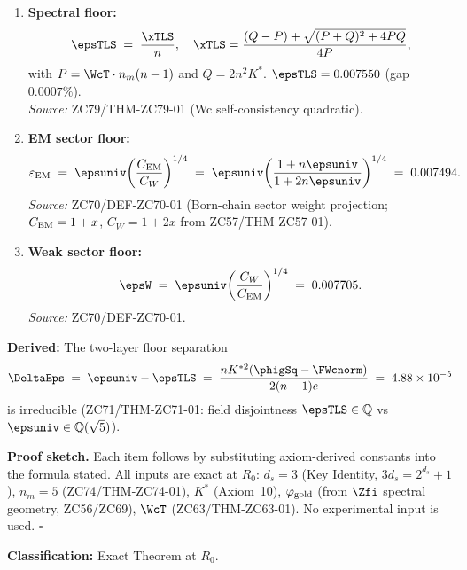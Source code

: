 \documentclass[12pt, a4paper]{article}
\renewcommand{\epsEM}{\varepsilon_{\rm EM}}
\begin{document}
\begin{formalbox}[title={THM-ZC80-01: Electroweak Completeness
  ($R_0$, Exact)}]
\begin{enumerate}[leftmargin=2em, label=\textbf{(\arabic*)}]
\item \textbf{Spectral floor:}
\begin{equation}
  \epsTLS
  \;=\; \frac{\xTLS}{n},
  \quad
  \xTLS = \frac{(Q-P)+\sqrt{(P+Q)^2+4PQ}}{4P},
  \label{eq:epsTLS}
\end{equation}
with $P = \WcT\cdot n_m(n-1)$ and $Q = 2n^2K^*$. \quad
$\epsTLS = 0.007550$ (gap $0.0007\%$).\\
\textit{Source:} ZC79/THM-ZC79-01 (Wc self-consistency
quadratic).

\item \textbf{EM sector floor:}
\begin{equation}
  \epsEM
  \;=\; \epsuniv\!\left(\frac{C_{\rm EM}}{C_W}\right)^{1/4}
  \;=\; \epsuniv\!\left(\frac{1+n\epsuniv}{1+2n\epsuniv}\right)^{1/4}
  \;=\; 0.007494.
  \label{eq:epsEM}
\end{equation}
\textit{Source:} ZC70/DEF-ZC70-01 (Born-chain sector weight
projection; $C_{\rm EM} = 1+x$, $C_W = 1+2x$ from
ZC57/THM-ZC57-01).

\item \textbf{Weak sector floor:}
\begin{equation}
  \epsW
  \;=\; \epsuniv\!\left(\frac{C_W}{C_{\rm EM}}\right)^{1/4}
  \;=\; 0.007705.
  \label{eq:epsW}
\end{equation}
\textit{Source:} ZC70/DEF-ZC70-01.

\end{enumerate}

\textbf{Derived:} The two-layer floor separation
\begin{equation}
  \DeltaEps
  \;=\; \epsuniv - \epsTLS
  \;=\; \frac{nK^{*2}(\phigSq - \FWcnorm)}{2(n-1)e}
  \;=\; 4.88\times10^{-5}
  \label{eq:deltaeps}
\end{equation}
is irreducible (ZC71/THM-ZC71-01: field disjointness
$\epsTLS\in\mathbb{Q}$ vs $\epsuniv\in\mathbb{Q}(\sqrt{5})$).

\textbf{Proof sketch.}
Each item follows by substituting axiom-derived constants into
the formula stated. All inputs are exact at $R_0$:
$d_s = 3$ (Key Identity, $3d_s = 2^{d_s}+1$),
$n_m = 5$ (ZC74/THM-ZC74-01), $K^*$ (Axiom~10),
$\varphi_{\rm gold}$ (from $\Zfi$ spectral geometry, ZC56/ZC69),
$\WcT$ (ZC63/THM-ZC63-01).
No experimental input is used. \hfill$\square$

\textbf{Classification:} Exact Theorem at $R_0$.
\end{formalbox}

\end{document}
